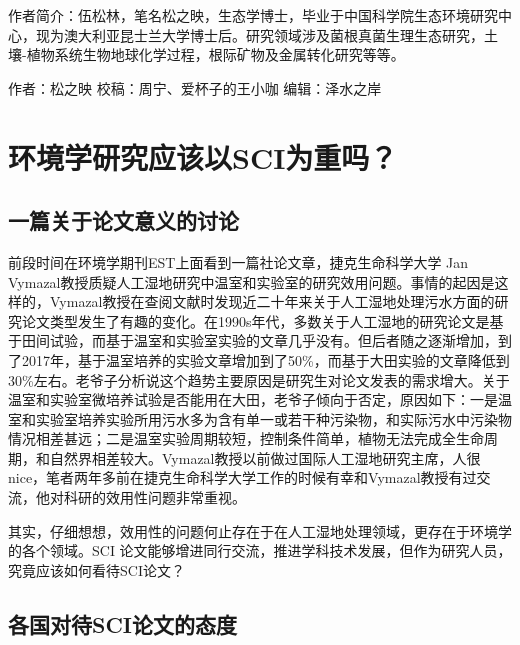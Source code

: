 \documentclass[]{book}
\begin{document}
作者简介：伍松林，笔名松之映，生态学博士，毕业于中国科学院生态环境研究中心，现为澳大利亚昆士兰大学博士后。研究领域涉及菌根真菌生理生态研究，土壤-植物系统生物地球化学过程，根际矿物及金属转化研究等等。

作者：松之映
校稿：周宁、爱杯子的王小咖
编辑：泽水之岸

\hypertarget{ux73afux5883ux5b66ux7814ux7a76ux5e94ux8be5ux4ee5sciux4e3aux91cdux5417}{%
\section{环境学研究应该以SCI为重吗？}\label{ux73afux5883ux5b66ux7814ux7a76ux5e94ux8be5ux4ee5sciux4e3aux91cdux5417}}

\hypertarget{ux4e00ux7bc7ux5173ux4e8eux8bbaux6587ux610fux4e49ux7684ux8ba8ux8bba}{%
\subsection{一篇关于论文意义的讨论}\label{ux4e00ux7bc7ux5173ux4e8eux8bbaux6587ux610fux4e49ux7684ux8ba8ux8bba}}

前段时间在环境学期刊EST上面看到一篇社论文章，捷克生命科学大学 Jan Vymazal教授质疑人工湿地研究中温室和实验室的研究效用问题。事情的起因是这样的，Vymazal教授在查阅文献时发现近二十年来关于人工湿地处理污水方面的研究论文类型发生了有趣的变化。在1990s年代，多数关于人工湿地的研究论文是基于田间试验，而基于温室和实验室实验的文章几乎没有。但后者随之逐渐增加，到了2017年，基于温室培养的实验文章增加到了50\%，而基于大田实验的文章降低到30\%左右。老爷子分析说这个趋势主要原因是研究生对论文发表的需求增大。关于温室和实验室微培养试验是否能用在大田，老爷子倾向于否定，原因如下：一是温室和实验室培养实验所用污水多为含有单一或若干种污染物，和实际污水中污染物情况相差甚远；二是温室实验周期较短，控制条件简单，植物无法完成全生命周期，和自然界相差较大。Vymazal教授以前做过国际人工湿地研究主席，人很nice，笔者两年多前在捷克生命科学大学工作的时候有幸和Vymazal教授有过交流，他对科研的效用性问题非常重视。

其实，仔细想想，效用性的问题何止存在于在人工湿地处理领域，更存在于环境学的各个领域。SCI 论文能够增进同行交流，推进学科技术发展，但作为研究人员，究竟应该如何看待SCI论文？

\hypertarget{ux5404ux56fdux5bf9ux5f85sciux8bbaux6587ux7684ux6001ux5ea6}{%
\subsection{各国对待SCI论文的态度}\label{ux5404ux56fdux5bf9ux5f85sciux8bbaux6587ux7684ux6001ux5ea6}}
\end{document}
